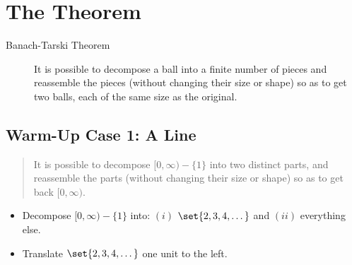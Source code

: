 \documentclass[12pt]{extarticle}
\begin{document}










\section{The Theorem}

\begin{description}
\item[Banach-Tarski Theorem]
It is possible to decompose a ball into a finite number of pieces and
reassemble the pieces (without changing their size or shape) so as to
get two balls, each of the same size as the original.

\end{description}




\subsection{Warm-Up Case 1: A Line}\label{warm-up-case-1-a-line}


\begin{quote}
It is possible to decompose $[0,\infty) - \{1\}$ into two distinct parts, and reassemble the parts (without changing their size or shape) so as to get back $[0,\infty)$. 


\end{quote}

\vspace{2mm}
\begin{center}
\end{center}


\begin{itemize}

\item Decompose $[0,\infty) - \{1\}$ into: $(i)$ $\set{2,3,4,\dots}$ and $(ii)$ everything else.

\item Translate $\set{2,3,4,\dots}$ one unit to the left.
\end{itemize}
\end{document}
